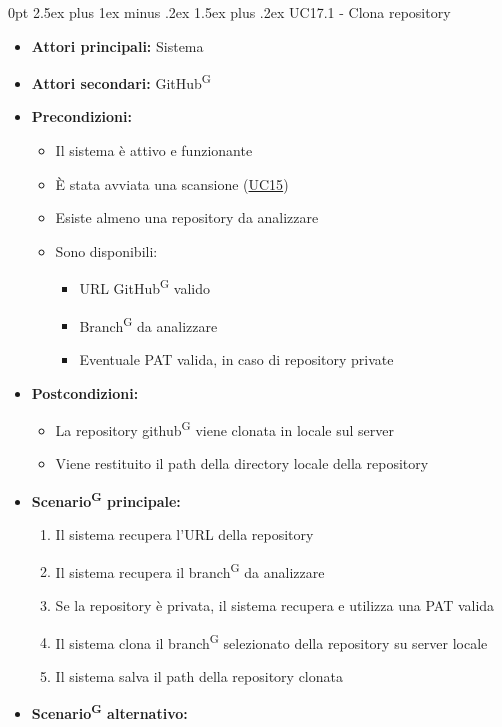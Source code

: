 \documentclass[a4paper, 11pt]{article}
\makeatletter
\renewcommand\paragraph{\@startsection{paragraph}{4}
  {0pt}
  {2.5ex plus 1ex minus .2ex}
  {1.5ex plus .2ex}
  {\normalfont\normalsize\bfseries\color{AccentDark}}}
\makeatother
\begin{document}
\paragraph{UC17.1 - Clona repository} \label{UC17.1}
\begin{itemize}
	\item \textbf{Attori principali:} Sistema
	\item \textbf{Attori secondari:} GitHub\textsuperscript{G}
	\item \textbf{Precondizioni:}
	\begin{itemize}
		\item Il sistema è attivo e funzionante
		\item È stata avviata una scansione (\hyperref[UC15]{UC15})
		\item Esiste almeno una repository da analizzare
		\item Sono disponibili:
		\begin{itemize}
			\item URL GitHub\textsuperscript{G} valido
			\item Branch\textsuperscript{G} da analizzare
			\item Eventuale PAT valida, in caso di repository private
		\end{itemize}
	\end{itemize}
	\item \textbf{Postcondizioni:}
	\begin{itemize}
		\item La repository github\textsuperscript{G} viene clonata in locale sul server
		\item Viene restituito il path della directory locale della repository
	\end{itemize}
	\item \textbf{Scenario\textsuperscript{G} principale:}
	\begin{enumerate}
		\item Il sistema recupera l'URL della repository
		\item Il sistema recupera il branch\textsuperscript{G} da analizzare
		\item Se la repository è privata, il sistema recupera e utilizza una PAT valida
		\item Il sistema clona il branch\textsuperscript{G} selezionato della repository su server locale
		\item Il sistema salva il path della repository clonata
	\end{enumerate}
	\item \textbf{Scenario\textsuperscript{G} alternativo:}

\end{itemize}
\end{document}
